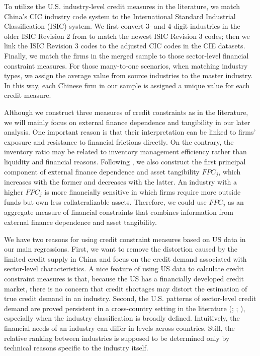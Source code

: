 To utilize the U.S. industry-level credit measures in the literature, we match China's CIC industry code system to the International Standard Industrial Classification (ISIC) system. We first convert 3- and 4-digit industries in the older ISIC Revision 2 from \cite{manova-wei-zhang2015} to match the newest ISIC Revision 3 codes; then we link the ISIC Revision 3 codes to the adjusted CIC codes in the CIE datasets. Finally, we match the firms in the merged sample to those sector-level financial constraint measures. For those many-to-one scenarios, when matching industry types, we assign the average value from source industries to the master industry. In this way, each Chinese firm in our sample is assigned a unique value for each credit measure.

Although we construct three measures of credit constraints as in the literature, we will mainly focus on external finance dependence and tangibility in our later analysis. One important reason is that their interpretation can be linked to firms' exposure and resistance to financial frictions directly. On the contrary, the inventory ratio may be related to inventory management efficiency rather than liquidity and financial reasons. Following \cite{manova-wei-zhang2015}, we also construct the first principal component of external finance dependence and asset tangibility $FPC_j$, which increases with the former and decreases with the latter. An industry with a higher $FPC_j$ is more financially sensitive in which firms require more outside funds but own less collateralizable assets. Therefore, we could use $FPC_j$ as an aggregate measure of financial constraints that combines information from external finance dependence and asset tangibility.

We have two reasons for using credit constraint measures based on US data in our main regressions. First, we want to remove the distortion caused by the limited credit supply in China and focus on the credit demand associated with sector-level characteristics. A nice feature of using US data to calculate credit constraint measures is that, because the US has a financially developed credit market, there is no concern that credit shortages may distort the estimation of true credit demand in an industry. Second, the U.S. patterns of sector-level credit demand are proved persistent in a cross-country setting in the literature (\cite{kroszner2007}; \cite{manova-wei-zhang2015}; \cite{fan-lai-li2015}), especially when the industry classification is broadly defined. Intuitively, the financial needs of an industry can differ in levels across countries. Still, the relative ranking between industries is supposed to be determined only by technical reasons specific to the industry itself.

